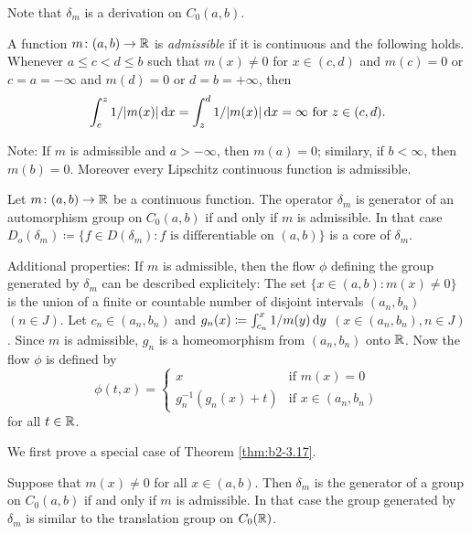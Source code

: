 Note that $\delta_{m}$ is a derivation on $C_{0}(a,b)$.
\begin{definition}\label{def:b2-3.16}
A function $m \colon (a,b) \to \mathbb{R}$ is \emph{admissible} if it is continuous and the following holds.
Whenever $a \leq c < d \leq b$ such that $m(x) \neq 0$ for $x \in (c,d)$ and $m(c) = 0$ or $c = a = -\infty$ and $m(d) = 0$ or $d = b = +\infty$, then
\begin{equation*}\label{eq:b2-3.16-KGK.1}
\int_{c}^{z} 1/|m(x)| \mathop{}\!\mathrm{d}{x} = \int_{z}^{d} 1/|m(x)| \mathop{}\!\mathrm{d}{x} = \infty \text{ for } z \in (c,d).
\end{equation*}
\end{definition}
Note: If $m$ is admissible and $a > -\infty$, then $m(a) = 0$; similary, if $b < \infty$, then $m(b) = 0$.
Moreover every Lipschitz continuous function is admissible.
\begin{theorem}\label{thm:b2-3.17}
Let $m \colon (a,b) \to \mathbb{R}$ be a continuous function.
The operator $\delta_{m}$ is generator of an automorphism group on $C_{0}(a,b)$ if and only if $m$ is admissible.
In that case $D_{o}(\delta_{m}) \coloneqq \{ f \in D(\delta_{m}) \colon f \text{ is differentiable on } (a,b)\}$ is a core of $\delta_{m}$.

\textup{Additional properties:} If $m$ is admissible, then the flow $\phi$ defining the group generated by $\delta_{m}$ can be described explicitely:
The set $\{x \in (a,b) \colon m(x) \neq 0\}$ is the union of a finite or countable number of disjoint intervals $(a_{n},b_{n})$ $(n \in J)$.
Let $c_{n} \in (a_{n},b_{n})$ and $g_{n}(x) \coloneqq \int_{c_{n}}^{x} 1/m(y) \mathop{}\!\mathrm{d}{y}$ $(x \in (a_{n},b_{n}), n \in J)$.
Since $m$ is admissible, $g_{n}$ is a homeomorphism from $(a_{n},b_{n})$ onto $\mathbb{R}$.
Now the flow $\phi$ is defined by
\begin{equation}\label{eq:b2-3.22}
\phi(t,x) = \begin{cases}
    x & \text{if } m(x) = 0 \\
    g_{n}^{-1}(g_{n}(x)+t) & \text{if } x \in (a_{n},b_{n})
\end{cases}
\end{equation}
for all $t \in \mathbb{R}$.
\end{theorem}
We first prove a special case of Theorem \ref{thm:b2-3.17}.
\begin{proposition}\label{prop:b2-3.18}
Suppose that $m(x) \neq 0$ for all $x \in (a,b)$.
Then $\delta_{m}$ is the generator of a group on $C_{0}(a,b)$ if and only if $m$ is admissible.
In that case the group generated by $\delta_{m}$ is similar to the translation group on $C_{0}(\mathbb{R})$.
\end{proposition}
